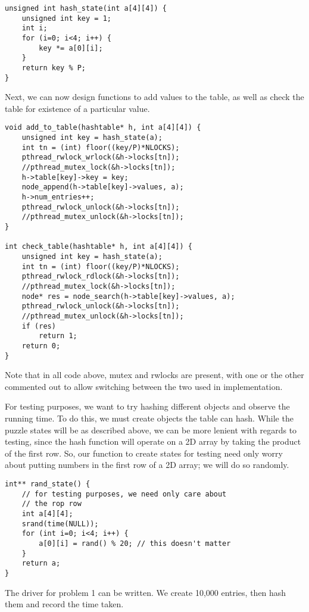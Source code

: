\documentclass[11pt]{article}
\begin{document}
\begin{verbatim}
unsigned int hash_state(int a[4][4]) {
    unsigned int key = 1;
    int i;
    for (i=0; i<4; i++) {
        key *= a[0][i];
    }
    return key % P;
}
\end{verbatim}

Next, we can now design functions to add values to the table, as well
as check the table for existence of a particular value.

\begin{verbatim}
void add_to_table(hashtable* h, int a[4][4]) {
    unsigned int key = hash_state(a);
    int tn = (int) floor((key/P)*NLOCKS);
    pthread_rwlock_wrlock(&h->locks[tn]);
    //pthread_mutex_lock(&h->locks[tn]);
    h->table[key]->key = key;
    node_append(h->table[key]->values, a);
    h->num_entries++;
    pthread_rwlock_unlock(&h->locks[tn]);
    //pthread_mutex_unlock(&h->locks[tn]);
}

int check_table(hashtable* h, int a[4][4]) {
    unsigned int key = hash_state(a);
    int tn = (int) floor((key/P)*NLOCKS);
    pthread_rwlock_rdlock(&h->locks[tn]);
    //pthread_mutex_lock(&h->locks[tn]);
    node* res = node_search(h->table[key]->values, a);
    pthread_rwlock_unlock(&h->locks[tn]);
    //pthread_mutex_unlock(&h->locks[tn]);
    if (res)
        return 1;
    return 0;
}
\end{verbatim}

Note that in all code above, mutex and rwlocks are present, with one
or the other commented out to allow switching between the two used in
implementation.

For testing purposes, we want to try hashing different objects and
observe the running time. To do this, we must create objects the table
can hash. While the puzzle states will be as described above, we can
be more lenient with regards to testing, since the hash function will
operate on a 2D array by taking the product of the first row. So, our
function to create states for testing need only worry about putting
numbers in the first row of a 2D array; we will do so randomly.

\begin{verbatim}
int** rand_state() {
    // for testing purposes, we need only care about
    // the rop row
    int a[4][4];
    srand(time(NULL));
    for (int i=0; i<4; i++) {
        a[0][i] = rand() % 20; // this doesn't matter
    }
    return a;
}
\end{verbatim}

The driver for problem 1 can be written. We create 10,000 entries,
then hash them and record the time taken.
\end{document}
